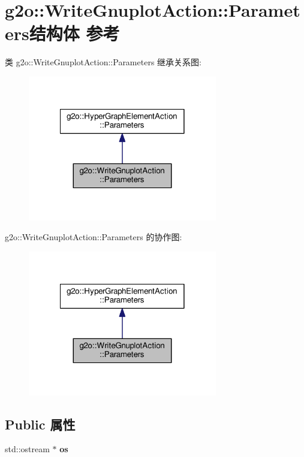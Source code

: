 \hypertarget{structg2o_1_1WriteGnuplotAction_1_1Parameters}{\section{g2o\-:\-:Write\-Gnuplot\-Action\-:\-:Parameters结构体 参考}
\label{structg2o_1_1WriteGnuplotAction_1_1Parameters}
}


类 g2o\-:\-:Write\-Gnuplot\-Action\-:\-:Parameters 继承关系图\-:
\nopagebreak
\begin{figure}[H]
\begin{center}
\leavevmode
\includegraphics[width=234pt]{structg2o_1_1WriteGnuplotAction_1_1Parameters__inherit__graph}
\end{center}
\end{figure}


g2o\-:\-:Write\-Gnuplot\-Action\-:\-:Parameters 的协作图\-:
\nopagebreak
\begin{figure}[H]
\begin{center}
\leavevmode
\includegraphics[width=234pt]{structg2o_1_1WriteGnuplotAction_1_1Parameters__coll__graph}
\end{center}
\end{figure}
\subsection*{Public 属性}
\begin{DoxyCompactItemize}
\item 
\hypertarget{structg2o_1_1WriteGnuplotAction_1_1Parameters_a8e25b8cffdc008929a939cf9080c5902}{std\-::ostream $\ast$ {\bfseries os}}\label{structg2o_1_1WriteGnuplotAction_1_1Parameters_a8e25b8cffdc008929a939cf9080c5902}

\end{DoxyCompactItemize}


